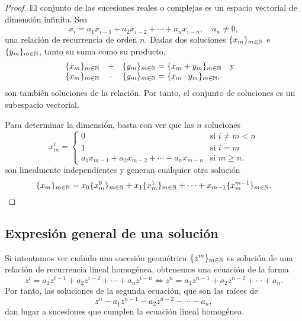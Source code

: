 \begin{proof}
    El conjunto de las sucesiones reales o complejas
    es un espacio vectorial de dimensión infinita.
    Sea
    \begin{equation*}
        x_i = a_1x_{i-1} + a_2x_{i-2} + \cdots + a_nx_{i-n},
        \quad a_n \ne 0,
    \end{equation*}
    una relación de recurrencia de orden $n$.
    Dadas dos soluciones $\{x_m\}_{m \in \mathbb{N}}$ e $\{y_m\}_{m \in \mathbb{N}}$,
    tanto su suma como su producto,
    \begin{equation*}
        \begin{array}{lcl}
            \{x_m\}_{m \in \N} &   +   & \{y_m\}_{m \in \N} =
                \{x_m + y_m\}_{m \in \N} \qq{y} \\
            \{x_m\}_{m \in \N} & \cdot & \{y_m\}_{m \in \N} =
                \{x_m \cdot y_m\}_{m \in \N},
        \end{array}
    \end{equation*}
    son también soluciones de la relación.
    Por tanto, el conjunto de soluciones es un subespacio vectorial.

    Para determinar la dimensión, basta con ver que las $n$ soluciones
    \begin{equation*}
        x^i_m =
        \begin{cases}
            0 & \text{si $i \ne m < n$} \\
            1 & \text{si $i = m$} \\
            a_1x_{m-1} + a_2x_{m-2} + \cdots + a_nx_{m-n}
                & \text{si $m \ge n$.}
        \end{cases}
    \end{equation*}
    son linealmente independientes y generan cualquier otra solución
    \begin{equation*}
        \{x_m\}_{m \in \mathbb{N}} =
        x_0\{x^0_m\}_{m \in \mathbb{N}} + x_1\{x^1_m\}_{m \in \mathbb{N}} + \cdots +
        x_{m-1}\{x^{m-1}_m\}_{m \in \mathbb{N}}. \qedhere
    \end{equation*}
\end{proof}

\subsection{Expresión general de una solución}

Si intentamos ver cuándo una sucesión geométrica $\{z^m\}_{m \in \mathbb{N}}$
es solución de una relación de recurrencia lineal homogénea,
obtenemos una ecuación de la forma
\begin{equation*}
    z^i = a_1z^{i-1} + a_2z^{i-2} + \cdots + a_nz^{i-n} \iff
    z^n = a_1z^{n-1} + a_2z^{n-2} + \cdots + a_n.
\end{equation*}
Por tanto, las soluciones de la segunda ecuación,
que son las raíces de
\begin{equation*}
    z^n - a_1z^{n-1} - a_2z^{n-2} - \cdots - a_n,
\end{equation*}
dan lugar a sucesiones que cumplen la ecuación lineal homogénea.


